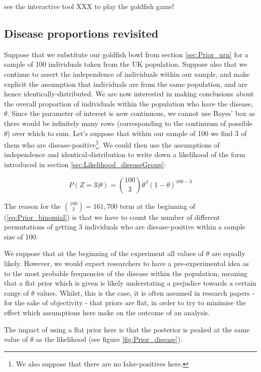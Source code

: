 \documentclass[11pt,fullpage]{book}
\begin{document}
 see the interactive tool XXX to play the goldfish game!

\subsection{Disease proportions revisited}\label{sec:Prior_diseaseProp}
Suppose that we substitute our goldfish bowl from section \ref{sec:Prior_urn} for a sample of 100 individuals taken from the UK population. Suppose also that we continue to assert the independence of individuals within our sample, and make explicit the assumption that individuals are from the same population, and are hence identically-distributed. We are now interested in making conclusions about the overall proportion of individuals within the population who have the disease, $\theta$. Since the parameter of interest is now continuous, we cannot use Bayes' box as there would be infinitely many rows (corresponding to the continuum of possible $\theta$) over which to sum. Let's suppose that within our sample of 100 we find 3 of them who are disease-positive\footnote{We also suppose that there are no false-positives here.}. We could then use the assumptions of independence and identical-distribution to write down a likelihood of the form introduced in section \ref{sec:Likelihood_diseaseGroup}:

\begin{equation}\label{eq:Prior_binomial}
P(Z=3|\theta) = {100 \choose 3} \theta^\beta (1-\theta)^{100-3}
\end{equation}

The reason for the ${100 \choose 3}=161,700$ term at the beginning of (\ref{eq:Prior_binomial}) is that we have to count the number of different permutations of getting 3 individuals who are disease-positive within a sample size of 100. 

We suppose that at the beginning of the experiment all values of $\theta$ are equally likely. However, we would expect researchers to have a pre-experimental idea as to the most probable frequencies of the disease within the population, meaning that a flat prior which is given is likely understating a prejudice towards a certain range of $\theta$ values. Whilst, this is the case, it is often assumed in research papers - for the sake of objectivity - that priors are flat, in order to try to minimise the effect which assumptions here make on the outcome of an analysis.

The impact of using a flat prior here is that the posterior is peaked at the same value of $\theta$ as the likelihood (see figure \ref{fig:Prior_disease}). 
\end{document}
